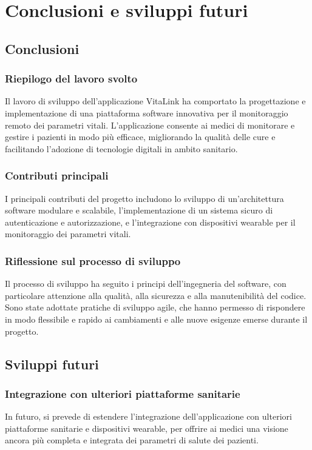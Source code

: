 \documentclass[12pt,a4paper,oneside]{report}
\begin{document}
\chapter{Conclusioni e sviluppi futuri}
\section{Conclusioni}
\subsection{Riepilogo del lavoro svolto}
Il lavoro di sviluppo dell'applicazione VitaLink ha comportato la progettazione e implementazione di una piattaforma software innovativa per il monitoraggio remoto dei parametri vitali. L'applicazione consente ai medici di monitorare e gestire i pazienti in modo più efficace, migliorando la qualità delle cure e facilitando l'adozione di tecnologie digitali in ambito sanitario.

\subsection{Contributi principali}
I principali contributi del progetto includono lo sviluppo di un'architettura software modulare e scalabile, l'implementazione di un sistema sicuro di autenticazione e autorizzazione, e l'integrazione con dispositivi wearable per il monitoraggio dei parametri vitali.

\subsection{Riflessione sul processo di sviluppo}
Il processo di sviluppo ha seguito i principi dell'ingegneria del software, con particolare attenzione alla qualità, alla sicurezza e alla manutenibilità del codice. Sono state adottate pratiche di sviluppo agile, che hanno permesso di rispondere in modo flessibile e rapido ai cambiamenti e alle nuove esigenze emerse durante il progetto.

\section{Sviluppi futuri}
\subsection{Integrazione con ulteriori piattaforme sanitarie}
In futuro, si prevede di estendere l'integrazione dell'applicazione con ulteriori piattaforme sanitarie e dispositivi wearable, per offrire ai medici una visione ancora più completa e integrata dei parametri di salute dei pazienti.
\end{document}
